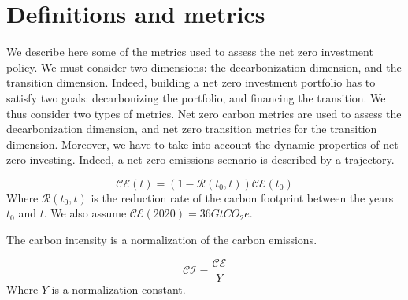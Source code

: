 \section{Definitions and metrics}
We describe here some of the metrics used to assess the net zero investment policy. We must consider two dimensions: the decarbonization dimension, and the transition dimension. Indeed, building a net zero investment portfolio has to satisfy two goals: decarbonizing the portfolio, and financing the transition. We thus consider two types of metrics. Net zero carbon metrics are used to assess the decarbonization dimension, and net zero transition metrics for the transition dimension. 
Moreover, we have to take into account the dynamic properties of net zero investing. Indeed, a net zero emissions scenario is described by a trajectory. 


\begin{definition}
    \begin{equation}
        \mathcal{CE}(t) = (1 - \mathcal{R}(t_0, t))\mathcal{CE}(t_0)
    \end{equation}
    Where $\mathcal{R}(t_0, t)$ is the reduction rate of the carbon footprint between the years $t_0$ and $t$. We also assume $\mathcal{CE}(2020)=36 GtCO_2e$.
\end{definition}


\begin{definition}
    The carbon intensity is a normalization of the carbon emissions.

    \begin{equation}
        \mathcal{CI} = \frac{\mathcal{CE}}{Y} 
    \end{equation}
    Where $Y$ is a normalization constant.
\end{definition}